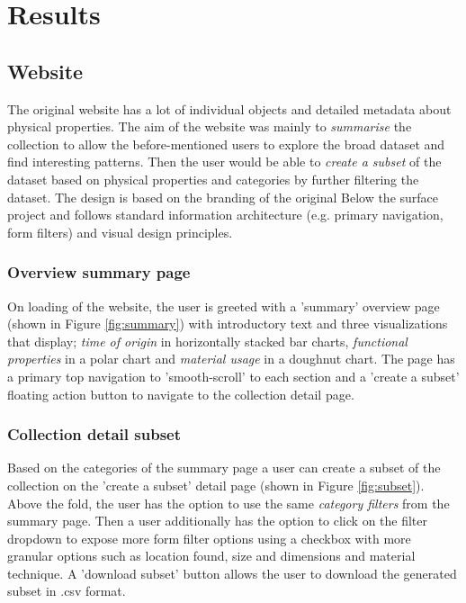 \section{Results}

\subsection{Website}

The original website has a lot of individual objects and detailed metadata about physical properties. The aim of the website was mainly to \textit{summarise} the collection to allow the before-mentioned users to explore the broad dataset and find interesting patterns. Then the user would be able to  \textit{create a subset} of the dataset based on physical properties and categories by further filtering the dataset. The design is based on the branding of the original Below the surface project and follows standard information architecture (e.g. primary navigation, form filters) and visual design principles.

\subsubsection{Overview summary page}
On loading of the website, the user is greeted with a 'summary' overview page (shown in Figure \ref{fig:summary}) with introductory text and three visualizations that display; \textit{time of origin} in horizontally stacked bar charts, \textit{functional properties} in a polar chart and \textit{material usage} in a doughnut chart. The page has a primary top navigation to 'smooth-scroll' to each section and a 'create a subset' floating action button to navigate to the collection detail page.

\subsubsection{Collection detail subset}
Based on the categories of the summary page a user can create a subset of the collection on the 'create a subset' detail page (shown in Figure \ref{fig:subset}). Above the fold, the user has the option to use the same \textit{category filters} from the summary page. Then a user additionally has the option to click on the filter dropdown to expose more form filter options using a checkbox with more granular options such as location found, size and dimensions and material technique. A 'download subset' button allows the user to download the generated subset in .csv format.

